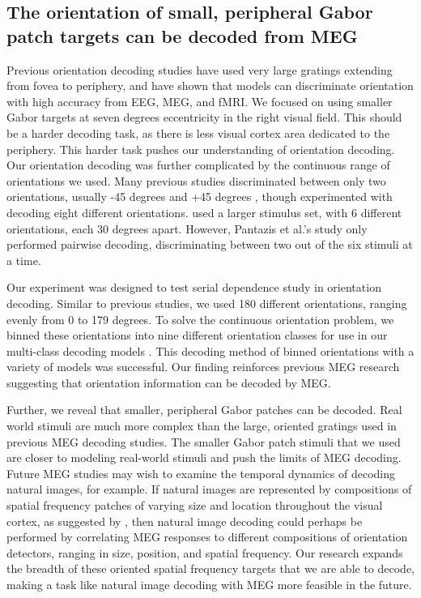 \documentclass[../main.tex]{subfiles}
\begin{document}
\subsection{The orientation of small, peripheral Gabor patch targets can be decoded from MEG}
Previous orientation decoding studies \citep{haynes_rees_2005, kamitani_tong_2005, GARCIA2013515, cichy_ramirez_pantazis_2015, pantazis_fang_qin_mohsenzadeh_li_cichy_2018} have used very large gratings extending from fovea to periphery, and have shown that models can discriminate orientation with high accuracy from EEG, MEG, and fMRI. We focused on using smaller Gabor targets at seven degrees eccentricity in the right visual field. This should be a harder decoding task, as there is less visual cortex area dedicated to the periphery. This harder task pushes our understanding of orientation decoding. Our orientation decoding was further complicated by the continuous range of orientations we used. Many previous studies discriminated between only two orientations, usually -45 degrees and +45 degrees \citep{haynes_rees_2005, cichy_ramirez_pantazis_2015, GARCIA2013515}, though \cite{kamitani_tong_2005} experimented with decoding eight different orientations. \cite{pantazis_fang_qin_mohsenzadeh_li_cichy_2018} used a larger stimulus set, with 6 different orientations, each 30 degrees apart. However, Pantazis et al.'s study only performed pairwise decoding, discriminating between two out of the six stimuli at a time. 

Our experiment was designed to test serial dependence study in orientation decoding. Similar to previous studies, we used 180 different orientations, ranging evenly from 0 to 179 degrees. To solve the continuous orientation problem, we binned these orientations into nine different orientation classes for use in our multi-class decoding models \citep{haynes_rees_2005, Brouwer09, Brouwer, GARCIA2013515, cichy_ramirez_pantazis_2015}. This decoding method of binned orientations with a variety of models was successful. Our finding reinforces previous MEG research \citep{cichy_ramirez_pantazis_2015, pantazis_fang_qin_mohsenzadeh_li_cichy_2018} suggesting that orientation information can be decoded by MEG. 

Further, we reveal that smaller, peripheral Gabor patches can be decoded. Real world stimuli are much more complex than the large, oriented gratings used in previous MEG decoding studies. The smaller Gabor patch stimuli that we used are closer to modeling real-world stimuli and push the limits of MEG decoding. Future MEG studies may wish to examine the temporal dynamics of decoding natural images, for example. If natural images are represented by compositions of spatial frequency patches of varying size and location throughout the visual cortex, as suggested by \cite{OLSHAUSEN19973311}, then natural image decoding could perhaps be performed by correlating MEG responses to different compositions of orientation detectors, ranging in size, position, and spatial frequency. Our research expands the breadth of these oriented spatial frequency targets that we are able to decode, making a task like natural image decoding with MEG more feasible in the future.
\end{document}
